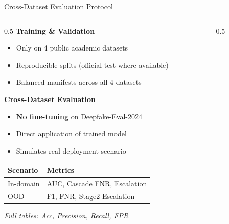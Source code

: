 \documentclass[aspectratio=169,12pt]{beamer}
\newcommand{\alerttext}[1]{\textcolor{alertred}{\textbf{#1}}}
\begin{document}
\begin{frame}{Cross-Dataset Evaluation Protocol}
\begin{columns}[T]
\begin{column}{0.5\textwidth}
\small
\textbf{Training \& Validation}
\begin{itemize}
\setlength\itemsep{-0.05em}
    \item Only on 4 public academic datasets
    \item Reproducible splits (official test where available)
    \item Balanced manifests across all 4 datasets
\end{itemize}

\textbf{Cross-Dataset Evaluation}
\begin{itemize}
\setlength\itemsep{0.05em}
    \item \alerttext{No fine-tuning} on Deepfake-Eval-2024
    \item Direct application of trained model
    \item Simulates real deployment scenario
\end{itemize}

\vspace{0.05em}
\begin{center}
\tiny
\begin{tabular}{ll}
\toprule
\textbf{Scenario} & \textbf{Metrics} \\
\midrule
In-domain & AUC, Cascade FNR, Escalation \\
OOD & F1, FNR, Stage2 Escalation \\
\bottomrule
\end{tabular}
\end{center}

{\tiny \textit{Full tables: Acc, Precision, Recall, FPR}}
\end{column}

\begin{column}{0.5\textwidth}
\end{column}
\end{columns}
\end{frame}
\end{document}
